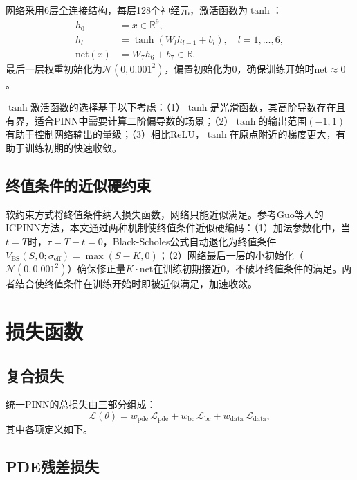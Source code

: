 网络采用6层全连接结构，每层128个神经元，激活函数为$\tanh$：
\begin{align}
  h_0 &= x \in \mathbb{R}^9, \\
  h_l &= \tanh(W_l h_{l-1} + b_l), \quad l=1,\ldots,6, \\
  \text{net}(x) &= W_7 h_6 + b_7 \in \mathbb{R}.
\end{align}
最后一层权重初始化为$\mathcal{N}(0, 0.001^2)$，偏置初始化为0，确保训练开始时$\text{net}\approx 0$。

$\tanh$激活函数的选择基于以下考虑：（1）$\tanh$是光滑函数，其高阶导数存在且有界，适合PINN中需要计算二阶偏导数的场景；（2）$\tanh$的输出范围$(-1,1)$有助于控制网络输出的量级；（3）相比ReLU，$\tanh$在原点附近的梯度更大，有助于训练初期的快速收敛。

\subsection{终值条件的近似硬约束}

软约束方式将终值条件纳入损失函数，网络只能近似满足。参考Guo等人\cite{guo2024icpinn}的ICPINN方法，本文通过两种机制使终值条件近似硬编码：（1）加法参数化中，当$t=T$时，$\tau=T-t=0$，Black-Scholes公式自动退化为终值条件$V_\text{BS}(S,0;\sigma_\text{eff})=\max(S-K,0)$；（2）网络最后一层的小初始化（$\mathcal{N}(0,0.001^2)$）确保修正量$K\cdot\text{net}$在训练初期接近0，不破坏终值条件的满足。两者结合使终值条件在训练开始时即被近似满足，加速收敛。

\section{损失函数}\label{sec:loss}

\subsection{复合损失}

统一PINN的总损失由三部分组成：
\begin{equation}\label{eq:total_loss}
  \mathcal{L}(\theta) = w_\text{pde}\,\mathcal{L}_\text{pde}
                      + w_\text{bc}\,\mathcal{L}_\text{bc}
                      + w_\text{data}\,\mathcal{L}_\text{data},
\end{equation}
其中各项定义如下。

\subsection{PDE残差损失}

